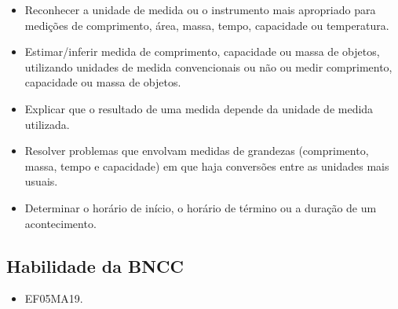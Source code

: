 \begin{itemize}
\item Reconhecer a unidade de medida ou o instrumento mais apropriado para
medições de comprimento, área, massa, tempo, capacidade ou temperatura.

\item Estimar/inferir medida de comprimento, capacidade ou massa de objetos,
utilizando unidades de medida convencionais ou não ou medir comprimento,
capacidade ou massa de objetos.

\item Explicar que o resultado de uma medida depende da unidade de medida utilizada.

\item Resolver problemas que envolvam medidas de grandezas (comprimento,
massa, tempo e capacidade) em que haja conversões entre as unidades mais
usuais.

\item Determinar o horário de início, o horário de término ou a duração de
um acontecimento.
\end{itemize}

\subsection{Habilidade da BNCC}

\begin{itemize}
\item EF05MA19.
\end{itemize}


